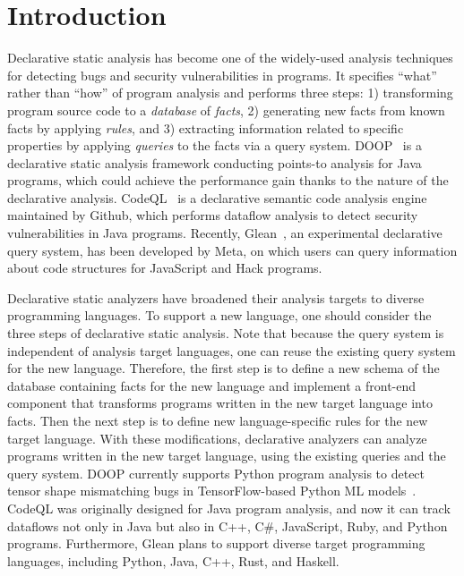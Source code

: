 \section{Introduction}
Declarative static analysis has become one of the widely-used analysis techniques
for detecting bugs and security vulnerabilities in programs.
It specifies ``what'' rather than ``how'' of program analysis and
performs three steps:
1) transforming program source code to a {\it database}
of {\it facts}, 2) generating new facts from known facts by applying
{\it rules}, and 3) extracting information related to specific properties by
applying {\it queries} to the facts via a query system.  DOOP~\cite{doop} is a
declarative static analysis framework conducting points-to analysis for Java
programs, which could achieve the performance gain thanks to the nature
of the declarative analysis. CodeQL~\cite{codeql} is a declarative semantic code analysis engine
maintained by Github, which performs dataflow analysis to detect security
vulnerabilities in Java programs.  Recently, Glean~\cite{glean}, an experimental
declarative query system, has been developed by Meta, on which users can query
information about code structures for JavaScript and Hack programs.

Declarative static analyzers have broadened their analysis targets to diverse
programming languages. To support a new language, one should consider
the three steps of declarative static analysis. Note that because the query
system is independent of analysis target languages, one can reuse the
existing query system for the new language. Therefore, the first step
is to define a new schema of the database containing facts for the new
language and implement a
front-end component that transforms programs written in the new target language into facts.
Then the next step is to define new language-specific rules for the new target language.  With these
modifications, declarative analyzers can analyze programs written in the new
target language, using the existing queries and the query system.  DOOP currently
supports Python program analysis to detect tensor shape mismatching bugs in
TensorFlow-based Python ML models~\cite{lagouvardos2020static}. CodeQL was
originally designed for Java program analysis, and now it can track dataflows not only
in Java but also in C++, C\#, JavaScript, Ruby, and Python programs.
Furthermore, Glean plans to support diverse target programming languages,
including Python, Java, C++, Rust, and Haskell.

